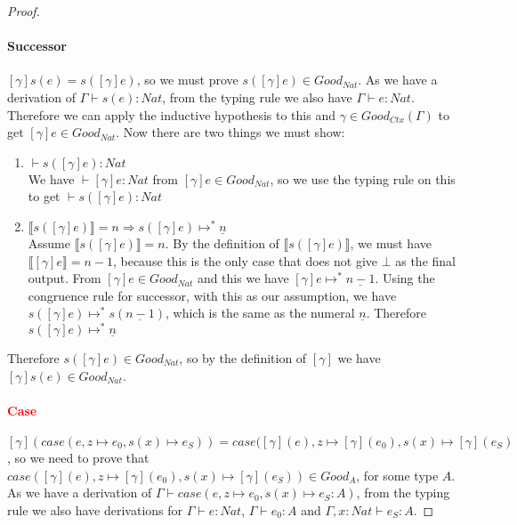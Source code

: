\begin{proof}
\paragraph{Successor}$[\gamma]s(e) = s([\gamma]e)$, so we must prove $s([\gamma]e) \in Good_{Nat}$. As we have a derivation of $\Gamma \vdash s(e) : Nat$, from the typing rule we also have $\Gamma \vdash e : Nat$. Therefore we can apply the inductive hypothesis to this and $\gamma \in Good_{Ctx}(\Gamma)$ to get $[\gamma]e \in Good_{Nat}$. Now there are two things we must show:

\begin{enumerate}
\item{$\vdash s([\gamma]e) : Nat$ \\
We have $\vdash [\gamma]e : Nat$ from $[\gamma]e \in Good_{Nat}$, so we use the typing rule on this to get $\vdash s([\gamma]e) : Nat$}
\item{\textbf{$\llbracket s([\gamma]e) \rrbracket = n \Rightarrow s([\gamma]e) \mapsto^* \underline{n}$} \\
Assume $\llbracket s([\gamma]e) \rrbracket = n$. By the definition of $\llbracket s([\gamma]e) \rrbracket$, we  must have $\llbracket [\gamma]e \rrbracket = n - 1$, because this is the only case that does not give $\bot$ as the final output. From $[\gamma]e \in Good_{Nat}$ and this we have $[\gamma]e \mapsto^* \underline{n - 1}$. Using the congruence rule for successor, with this as our assumption, we have $s([\gamma]e) \mapsto^* s(\underline{n -1})$, which is the same as the numeral $\underline{n}$. Therefore $s([\gamma]e) \mapsto^* \underline{n}$
}\end{enumerate}

Therefore $s([\gamma]e) \in Good_{Nat}$, so  by the definition of $[\gamma]$ we have $[\gamma]s(e)  \in Good_{Nat}$.

\paragraph{\textcolor{red}{Case}} $[\gamma](case (e, z \mapsto e_0, s(x) \mapsto e_S)) = case ([\gamma](e), z \mapsto [\gamma](e_0), s(x) \mapsto [\gamma](e_S)$ , so we need to prove that $case ([\gamma](e), z \mapsto [\gamma](e_0), s(x) \mapsto [\gamma](e_S)) \in Good_A$, for some type $A$. As we have a derivation of $\Gamma \vdash case (e, z \mapsto e_0, s(x) \mapsto e_S : A)$, from the typing rule we also have derivations for $\Gamma \vdash e : Nat$, $\Gamma \vdash e_0 : A$ and $\Gamma , x : Nat \vdash e_S : A$.


\end{proof}
